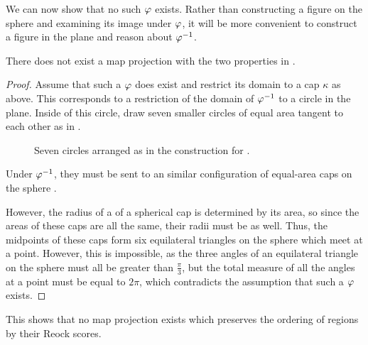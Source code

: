 


We can now show that no such $\varphi$ exists.  Rather than constructing a figure on the sphere and examining its image under $\varphi$, it will be more convenient to construct a figure in the plane and reason about $\varphi^{-1}$.
 
\begin{theorem}\label{thm:reockbad}
  There does not exist a map projection with the two properties in .
\end{theorem}
\begin{proof}
	
	Assume that such a $\varphi$ does exist and restrict its domain to a cap $\kappa$ as above.  This corresponds to a restriction of the domain of $\varphi^{-1}$ to a circle in the plane.  Inside of this circle, draw seven smaller circles of equal area tangent to each other as in .
	
	
	
  \begin{figure}[!htb]
	\label{fig:sevencircles}
	
	\centering

	
	\caption{Seven circles arranged as in the construction for .}
\end{figure}	
	

  Under $\varphi^{-1}$, they must be sent to an similar configuration 
  of equal-area caps on the sphere .  
  
  However, the radius of a
  of a spherical cap is determined by its area, so since the areas of these caps
  are all the same, their radii must be as well. Thus, 
  the midpoints of these caps form six equilateral triangles on the sphere
   which meet at a point.  However, this is impossible, as the three 
  angles of an equilateral triangle on the sphere must all be greater than $\tfrac{\pi}{3}$, 
  but the total measure of all the angles at a point must be equal to $2\pi$, which contradicts 
  the assumption that such a $\varphi$ exists.
\end{proof}

This shows that no map projection exists which preserves the ordering of regions by their Reock scores.
